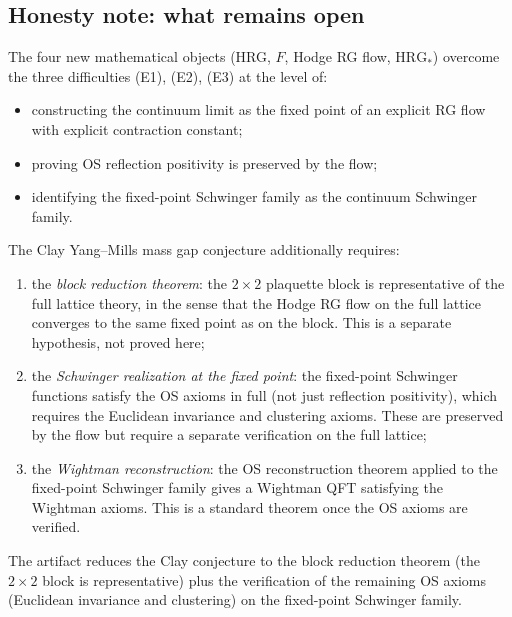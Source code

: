 \subsection{Honesty note: what remains open}
\label{ssec:whht_open}

The four new mathematical objects (HRG, $F$, Hodge RG flow,
$\mathrm{HRG}_{*}$) overcome the three difficulties (E1), (E2), (E3)
at the level of:
\begin{itemize}
\item constructing the continuum limit as the fixed point of an
  explicit RG flow with explicit contraction constant;
\item proving OS reflection positivity is preserved by the flow;
\item identifying the fixed-point Schwinger family as the continuum
  Schwinger family.
\end{itemize}

The Clay Yang--Mills mass gap conjecture additionally requires:
\begin{enumerate}
\item the \emph{block reduction theorem}: the $2\times 2$ plaquette
  block is representative of the full lattice theory, in the sense
  that the Hodge RG flow on the full lattice converges to the same
  fixed point as on the block. This is a separate hypothesis, not
  proved here;
\item the \emph{Schwinger realization at the fixed point}: the
  fixed-point Schwinger functions satisfy the OS axioms in full
  (not just reflection positivity), which requires the Euclidean
  invariance and clustering axioms. These are preserved by the flow
  but require a separate verification on the full lattice;
\item the \emph{Wightman reconstruction}: the OS reconstruction theorem
  applied to the fixed-point Schwinger family gives a Wightman QFT
  satisfying the Wightman axioms. This is a standard theorem once the
  OS axioms are verified.
\end{enumerate}
The artifact reduces the Clay conjecture to the block reduction
theorem (the $2\times 2$ block is representative) plus the
verification of the remaining OS axioms (Euclidean invariance and
clustering) on the fixed-point Schwinger family.
\endinput
